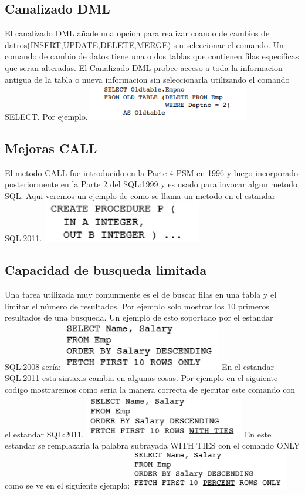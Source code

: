 \documentclass[twoside,twocolumn]{article}
\begin{document}
\subsection{Canalizado DML}
El canalizado DML añade una opcion para realizar coando de cambios de datros(INSERT,UPDATE,DELETE,MERGE) sin seleccionar el comando.
Un comando de cambio de datos tiene una o dos tablas que contienen filas especificas que seran alteradas. El Canalizado DML probee acceso a toda la informacion antigua de la tabla o nueva informacion sin seleccionarla utilizando el comando SELECT. Por ejemplo.
\includegraphics[width=7cm]{./Imagenes/codigo3} 
\subsection{Mejoras CALL}
El metodo CALL fue introducido en la Parte 4 PSM en 1996 y luego incorporado posteriormente en la Parte 2 del SQL:1999 y es usado para invocar algun metodo SQL. Aqui veremos un ejemplo de como se llama un metodo en el estandar SQL:2011.
\includegraphics[width=7cm]{./Imagenes/codigo4} 
\subsection{Capacidad de busqueda limitada}
Una tarea utilizada muy comunmente es el de buscar filas en una tabla y el limitar el número de resultados. Por ejemplo solo mostrar los 10 primeros resultados de una busqueda. Un ejemplo de esto soportado por el estandar SQL:2008 sería:
\includegraphics[width=7cm]{./Imagenes/codigo5}
En el estandar SQL:2011 esta sintaxis cambia en algunas cosas. Por ejemplo en el siguiente codigo mostraremos como seria la manera correcta de ejecutar este comando con el estandar SQL:2011.
 \includegraphics[width=7cm]{./Imagenes/codigo6}
 En este estandar se remplazaria la palabra subrayada WITH TIES con el comando ONLY como se ve en el siguiente ejemplo:
  \includegraphics[width=7cm]{./Imagenes/codigo7}
\end{document}
